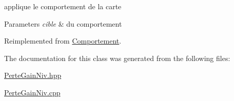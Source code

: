 applique le comportement de la carte 


\begin{DoxyParams}{Parameters}
{\em cible} & du comportement \\
\hline
\end{DoxyParams}


Reimplemented from \hyperlink{class_comportement_ae55149d29c710b0a5a0388cae308024f}{Comportement}.



The documentation for this class was generated from the following files\-:\begin{DoxyCompactItemize}
\item 
\hyperlink{_perte_gain_niv_8hpp}{Perte\-Gain\-Niv.\-hpp}\item 
\hyperlink{_perte_gain_niv_8cpp}{Perte\-Gain\-Niv.\-cpp}\end{DoxyCompactItemize}
